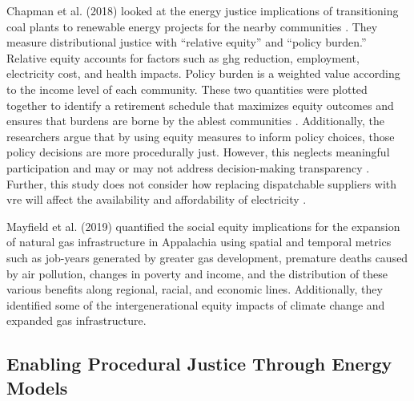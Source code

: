 Chapman et al. (2018) looked at the energy justice implications of transitioning
coal plants to renewable energy projects for the nearby communities
\cite{chapman_prioritizing_2018}. They measure distributional justice with
``relative equity'' and ``policy burden.'' Relative equity accounts for factors
such as \ac{ghg} reduction, employment, electricity cost, and health impacts.
Policy burden is a weighted value according to the income level of each
community. These two quantities were plotted together to identify a retirement
schedule that maximizes equity outcomes and ensures that burdens are borne by
the ablest communities \cite{chapman_prioritizing_2018}. Additionally, the
researchers argue that by using equity measures to inform policy choices, those
policy decisions are more procedurally just. However, this neglects meaningful
participation and may or may not address decision-making transparency
\cite{sovacool_energy_2015}. Further, this study does not consider how replacing
dispatchable suppliers with \ac{vre} will affect the availability and
affordability of electricity \cite{sovacool_energy_2015}.

Mayfield et al. (2019) quantified the social equity implications for the
expansion of natural gas infrastructure in Appalachia using spatial and temporal
metrics such as job-years generated by greater gas development, premature deaths
caused by air pollution, changes in poverty and income, and the distribution of
these various benefits along regional, racial, and economic lines. Additionally,
they identified some of the intergenerational equity impacts of climate change
and expanded gas infrastructure.

\subsection{Enabling Procedural Justice Through Energy Models}

